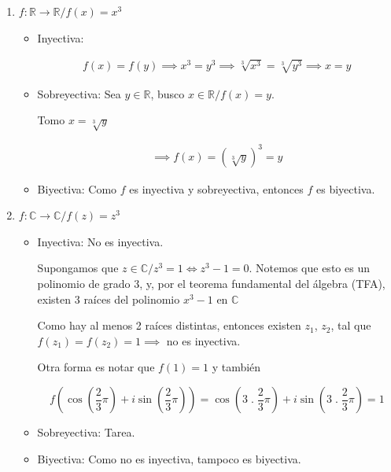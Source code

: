 \begin{enumerate}
    \item $f: \mathbb{R} \to \mathbb{R} / f(x) = x^3$
        \begin{itemize}
            \item Inyectiva:

                \begin{gather*}
                    f(x) = f(y) \implies x^3 = y^3 \implies \sqrt[3]{x^3}
                    = \sqrt[3]{y^3} \implies x = y
                \end{gather*}

            \item Sobreyectiva:
                Sea $y \in \mathbb{R}$, busco $x \in \mathbb{R} /f(x)=y$.

                Tomo $x = \sqrt[3]{y}$

                \begin{gather*}
                    \implies f(x) = {\left(\sqrt[3]{y} \right)}^3 = y
                \end{gather*}

            \item Biyectiva: Como $f$ es inyectiva y sobreyectiva, entonces 
                $f$ es biyectiva.
        \end{itemize}

    \item $f: \mathbb{C} \to \mathbb{C} / f(z) = z^3$

        \begin{itemize}
            \item Inyectiva: No es inyectiva.

                Supongamos que $z \in \mathbb{C} / z^3 = 1 \iff z^3-1 = 0$.
                Notemos que esto es un polinomio de grado 3, y, por el teorema
                fundamental del álgebra (TFA), existen 3 raíces del polinomio
                $x^3-1$ en $\mathbb{C}$

                Como hay al menos 2 raíces distintas, entonces existen $z_1$,
                $z_2$, tal que $f(z_1) = f(z_2) = 1 \implies$ no es inyectiva.

                Otra forma es notar que $f(1) = 1$ y también 
                
                \[ f \left(\cos{\left(\frac{2}{3} \pi \right)} 
                    + i \sin{\left(\frac{2}{3} \pi\right)}\right) =
                \cos{\left(3 \; . \; \frac{2}{3} \pi\right)} 
            + i \sin{\left(3 \; . \; \frac{2}{3} \pi\right)} = 1 \]

            \item Sobreyectiva: Tarea.

            \item Biyectiva: Como no es inyectiva, tampoco es biyectiva. 
        \end{itemize}
\end{enumerate}


